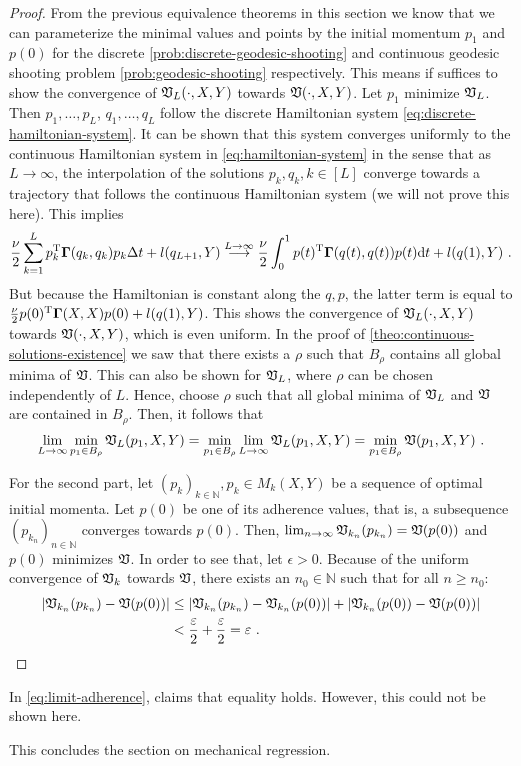 \begin{proof}
	From the previous equivalence theorems in this section we know that we can parameterize the minimal values and points by the initial momentum $p_1$ and $p(0)$ for the discrete \ref{prob:discrete-geodesic-shooting} and continuous geodesic shooting problem \ref{prob:geodesic-shooting} respectively.
	This means if suffices to show the convergence of $\mathfrak{V}_L(\cdot, X, Y)$ towards $\mathfrak{V}(\cdot, X, Y)$.
	Let $p_1$ minimize $\mathfrak{V}_L$.
	Then $p_1, \ldots, p_L$, $q_1, \ldots, q_L$ follow the discrete Hamiltonian system \ref{eq:discrete-hamiltonian-system}.
	It can be shown that this system converges uniformly to the continuous Hamiltonian system in \cref{eq:hamiltonian-system} in the sense that as $L \rightarrow \infty$, the interpolation of the solutions $p_k, q_k, k \in [L]$ converge towards a trajectory that follows the continuous Hamiltonian system (we will not prove this here).
	This implies
	\begin{equation}
		\frac{\nu}{2} \sum_{k=1}^L p_k^{\mathrm{T}} \mathbf{\Gamma}(q_k, q_k) p_k \Delta t + l(q_{L+1}, Y) 
		\stackrel{L \rightarrow \infty}{\longrightarrow} \frac{\nu}{2} \int_{0}^{1} p(t)^{\mathrm{T}} \mathbf{\Gamma}(q(t), q(t)) p(t) \mathrm{d} t + l(q(1), Y) \ . 
	\end{equation}
	But because the Hamiltonian is constant along the $q, p$, the latter term is equal to $\frac{\nu}{2} p(0)^{\mathrm{T}} \mathbf{\Gamma}(X, X) p(0) + l(q(1), Y)$.
	This shows the convergence of $\mathfrak{V}_L(\cdot, X, Y)$ towards $\mathfrak{V}(\cdot, X, Y)$, which is even uniform.
	In the proof of \cref{theo:continuous-solutions-existence} we saw that there exists a $\rho$ such that $B_\rho$ contains all global minima of $\mathfrak{V}$.
	This can also be shown for $\mathfrak{V}_L$, where $\rho$ can be chosen independently of $L$.
	Hence, choose $\rho$ such that all global minima of $\mathfrak{V}_L$ and $\mathfrak{V}$ are contained in $B_\rho$.
	Then, it follows that
	\begin{equation}
		\lim_{L \rightarrow \infty} \min_{p_1 \in B_\rho} \mathfrak{V}_L(p_1, X, Y) = \min_{p_1 \in B_\rho} \lim_{L \rightarrow \infty}  \mathfrak{V}_L(p_1, X, Y) = \min_{p_1 \in B_\rho} \mathfrak{V}(p_1, X, Y) \ .
	\end{equation}

	For the second part, let $(p_k)_{k \in \mathbb{N}}, p_k \in M_k(X, Y)$ be a sequence of optimal initial momenta.
	Let $p(0)$ be one of its adherence values, that is, a subsequence $(p_{k_n})_{n \in \mathbb{N}}$ converges towards $p(0)$.
	Then, $\lim_{n\rightarrow \infty} \mathfrak{V}_{k_n}(p_{k_n}) = \mathfrak{V}(p(0))$ and $p(0)$ minimizes $\mathfrak{V}$.
	In order to see that, let $\epsilon > 0$. 
	Because of the uniform convergence of $\mathfrak{V}_k$ towards $\mathfrak{V}$, there exists an $n_0 \in \mathbb{N}$ such that for all $n \geq n_0$:
	\begin{align}
		\abs{\mathfrak{V}_{k_n}(p_{k_n}) - \mathfrak{V}(p(0))} 
		&\leq \abs{\mathfrak{V}_{k_n}(p_{k_n}) - \mathfrak{V}_{k_n}(p(0))} + \abs{\mathfrak{V}_{k_n}(p(0)) - \mathfrak{V}(p(0))}\\
		&< \frac{\varepsilon}{2} + \frac{\varepsilon}{2} = \varepsilon \ .
	\end{align}
\end{proof}

In \cref{eq:limit-adherence}, \citet{owhadi20} claims that equality holds.
However, this could not be shown here.

This concludes the section on mechanical regression.